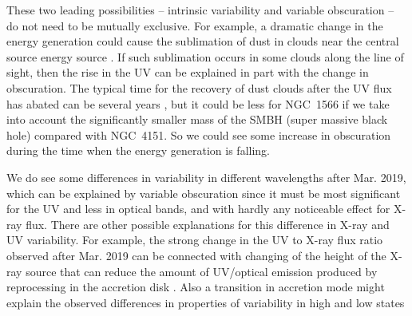 \documentclass[fleqn,usenatbib]{mnras}
\begin{document}
These two leading possibilities -- intrinsic variability and variable obscuration -- do not need to be mutually exclusive. For example, a dramatic change in the energy generation could cause the sublimation of dust in clouds near the central source energy source \citep{Oknyansky2017a, Oknyansky2019a}. If such sublimation occurs in some clouds along the line of sight, then the rise in the UV can be explained in part with the change in obscuration. The typical time for the recovery of dust clouds after the UV flux has abated can be several years \citep{Oknyansky2017a, Oknyansky2019a,  Kishimoto2013}, but it could be less for NGC~1566 if we take into account the significantly smaller mass of the SMBH (super massive black hole) compared with NGC~4151. So we could see some increase in obscuration during the time when the energy generation is falling.  

We do see some differences in variability in different wavelengths after Mar. 2019, which can be explained by variable obscuration since it must be most significant for the UV and less in optical bands, and with hardly any noticeable effect for X-ray flux.  There are other possible explanations for this difference in X-ray and UV variability. For example, the strong change in the UV to X-ray flux  ratio observed after Mar. 2019 can be connected with changing of the height of the X-ray source that can reduce the amount of UV/optical emission produced by reprocessing in the accretion disk \citep[see e.g.,][]{Breedt2009}. Also a transition in accretion mode might explain the observed differences in properties of  variability in  high and low states \citep[see e.g.,][]{Liu2020}
\end{document}
